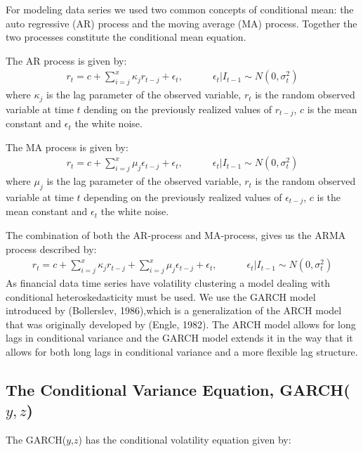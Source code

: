 For modeling data series we used two common concepts of conditional mean: the auto regressive (AR) process and the moving average (MA) process. Together the two processes constitute the conditional mean equation. 

The AR process is given by:
\begin{align}
    r_t=c + \sum_{i=j}^x\kappa_j r_{t-j} + \epsilon_t,\quad\quad\quad \epsilon_t | I_{t-1} \sim N(0,{\sigma_t^2}) \label{ConditionalMeanEquation}
\end{align}
where $\kappa_j$ is the lag parameter of the observed variable, $r_t$ is the random observed variable at time $t$ dending on the previously realized values of $r_{t-j}$, $c$ is the mean constant and $\epsilon_t$ the white noise.

The MA process is given by:
\begin{align}
    r_t=c + \sum_{i=j}^x\mu_j \epsilon_{t-j} + \epsilon_t,\quad\quad\quad \epsilon_t | I_{t-1} \sim N(0,{\sigma_t^2}) \label{ConditionalMeanEquation}
\end{align}
where $\mu_j$ is the lag parameter of the observed variable, $r_t$ is the random observed variable at time $t$ depending on the previously realized values of $\epsilon_{t-j}$, $c$ is the mean constant and $\epsilon_t$ the white noise.

The combination of both the AR-process and MA-process, gives us the ARMA process described by:
\begin{align}
    r_t=c +  \sum_{i=j}^x\kappa_j r_{t-j}+ \sum_{i=j}^x\mu_j \epsilon_{t-j} + \epsilon_t,\quad\quad\quad \epsilon_t | I_{t-1} \sim N(0,{\sigma_t^2}) \label{ConditionalMeanEquation}
\end{align}
As financial data time series have volatility clustering a model dealing with
conditional heteroskedasticity must be used. We use the GARCH model introduced by (Bollerslev, 1986),which is a generalization of the ARCH model that was originally developed by (Engle, 1982). The ARCH model allows for long lags in conditional variance and the GARCH model extends it in the way that it allows for both long lags in conditional variance and a more flexible lag structure.

\subsection*{The Conditional Variance Equation, GARCH($y,z$)}

The GARCH($y$,$z$) has the conditional volatility equation given by:

